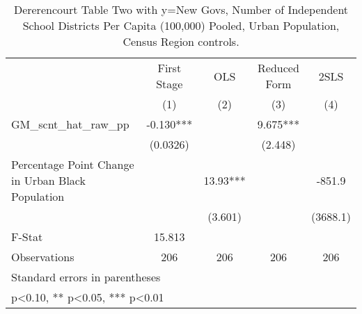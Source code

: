 \begin{table}[htbp]\centering
\def\sym#1{\ifmmode^{#1}\else\(^{#1}\)\fi}
\caption{Dererencourt Table Two with y=New Govs, Number of Independent School Districts Per Capita (100,000) Pooled, Urban Population, Census Region controls.}
\begin{tabular}{l*{4}{c}}
\toprule
                    & First Stage   &         OLS   &Reduced Form   &        2SLS   \\
                    &\multicolumn{1}{c}{(1)}   &\multicolumn{1}{c}{(2)}   &\multicolumn{1}{c}{(3)}   &\multicolumn{1}{c}{(4)}   \\
\midrule
GM\_scnt\_hat\_raw\_pp  &      -0.130***&               &       9.675***&               \\
                    &    (0.0326)   &               &     (2.448)   &               \\
\addlinespace
Percentage Point Change in Urban Black Population&               &       13.93***&               &      -851.9   \\
                    &               &     (3.601)   &               &    (3688.1)   \\
\midrule
F-Stat              &      15.813   &               &               &               \\
Observations        &         206   &         206   &         206   &         206   \\
\bottomrule
\multicolumn{5}{l}{\footnotesize Standard errors in parentheses}\\
\multicolumn{5}{l}{\footnotesize * p<0.10, ** p<0.05, *** p<0.01}\\
\end{tabular}
\end{table}
